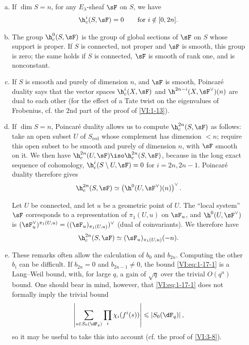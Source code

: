 \begin{enumerate}[a)]
  \item If $\dim S=n$, for any $E_\lambda$-sheaf $\sF$ on $S$, we have 
    \[
      \h_c^i(S,\sF) = 0 \qquad \text{for $i\notin [0,2n]$.}
    \]
  \item The group $\h_c^0(S,\sF)$ is the group of global sections of $\sF$ 
    on $S$ whose support is proper. If $S$ is connected, not proper and 
    $\sF$ is smooth, this group is zero; the same holds if $S$ is connected, 
    $\sF$ is smooth of rank one, and is nonconstant.
  \item If $S$ is smooth and purely of dimension $n$, and $\sF$ is smooth, 
    Poincaré duality says that the vector spaces 
    $\h_c^i(X,\sF)$ and $\h^{2n-i}(X,\sF^\vee)(n)$ are dual to each other 
    (for the effect of a Tate twist on the eigenvalues of Frobenius, 
    cf. the $2$nd part of the proof of \ref{VI:1-13}).
  \item If $\dim S=n$, Poincaré duality allows us to compute 
    $\h_c^{2n}(S,\sF)$ as follows: take an open subset $U$ of $S_\text{red}$ 
    whose complement has dimension $<n$; require this open subset to be smooth and 
    purely of dimension $n$, with $\sF$ smooth on it. We then have 
    $\h_c^{2n}(U,\sF) \iso \h_c^{2n}(S,\sF)$, because in the long exact sequence 
    of cohomology, $\h_c^i(S\setminus U,\sF) = 0$ for $i=2n,2n-1$. 
    Poincaré duality therefore gives 
    \[
      \h_c^{2n}(S,\sF) \simeq \left(\h^0(U,\sF^\vee)(n)\right)^\vee \text{.}
    \]
    
    Let $U$ be connected, and let $u$ be a geometric point of $U$. The 
    ``local system'' $\sF$ corresponds to a representation of 
    $\pi_1(U,u)$ on $\sF_u$, and $\h^0(U,\sF^\vee)$ is 
    $(\sF_u^\vee)^{\pi_1(U,u)}=((\sF_u)_{\pi_1(U,u)})^\vee$ (dual of 
    coinvariants). We therefore have 
\[
      \h_c^{2n}(S,\sF) \simeq (\sF_u)_{\pi_1(U,u)}(-n) \text{.}
    \]
  \item These remarks often allow the calculation of $b_0$ and $b_{2n}$. 
    Computing the other $b_i$ can be difficult. If $b_{2n}=0$ and 
    $b_{2n-1}\ne 0$, the bound \eqref{VI:eq:1-17-1} is a Lang--Weil bound, 
    with, for large $q$, a gain of $\sqrt q$ over the 
    trivial $O(q^n)$ bound. One should bear in mind, however, that 
    \eqref{VI:eq:1-17-1} does not formally imply the trivial bound 
    \[
      \left|\sum_{s\in S_0(\dF_q)} \prod_i \chi_i(f^i(s))\right| \leqslant \left| S_0(\dF_q)\right| \text{,}
    \]
    so it may be useful to take this into account (cf. the proof of \ref{VI:3-8}). 
\end{enumerate}

